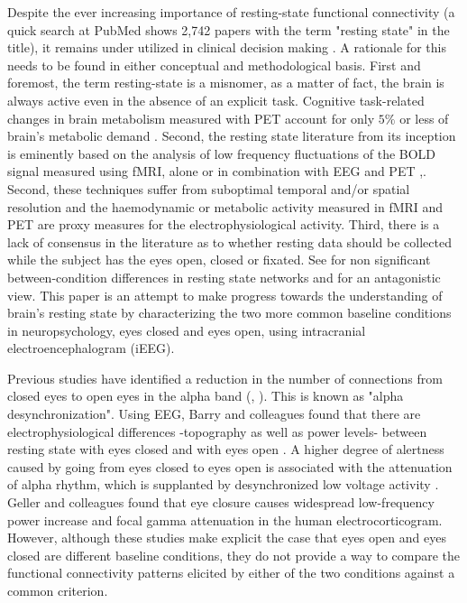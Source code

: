 \documentclass[11pt, onecolumn]{article}
\begin{document}
Despite the ever increasing importance of resting-state functional connectivity (a quick search at PubMed shows 2,742 papers with the term "resting state" in the title), it remains under utilized in clinical decision making \citep{tracy2015resting}.
A rationale for this needs to be found in either conceptual and methodological basis. First and foremost, the term resting-state is a misnomer, as a matter of fact, the brain is always active even in the absence of an explicit task. Cognitive task-related changes in brain metabolism measured with PET account for only $5\%$ or less of brain's metabolic demand \citep{sokoloff1955effect}. 
Second, the resting state literature from its inception is eminently based on the analysis of low frequency fluctuations of the BOLD signal measured using fMRI, alone or in combination with EEG and PET \citep{van2010exploring},\citep{musso2010spontaneous}. Second, these techniques suffer from suboptimal temporal and/or spatial resolution and the haemodynamic or metabolic activity measured in fMRI and PET are proxy measures for the electrophysiological activity. Third, there is a lack of consensus in the literature as to whether resting data should be collected while the subject has the eyes open, closed or fixated. See \citep{patriat2013effect} for non significant between-condition differences in resting state networks and \citep{yan2009spontaneous} for an antagonistic view. 
This paper is an attempt to make progress towards the understanding of brain's resting state by characterizing the two more common baseline conditions in neuropsychology, eyes closed and eyes open, using intracranial electroencephalogram (iEEG).

Previous studies have identified a reduction in the number of connections from closed eyes to open eyes in the alpha band (\citep{tan2013difference}, \citep{barry2007eeg}). This is known as  "alpha desynchronization". Using EEG, Barry and colleagues found that there are electrophysiological differences -topography as well as power levels- between resting state with eyes closed and with eyes open \citep{barry2007eeg}.  
A higher degree of alertness caused by going from eyes closed to eyes open is associated with the attenuation of alpha rhythm, which is supplanted by desynchronized low voltage activity \citep{niedermeyer2005electroencephalography}.
Geller and colleagues \citep{geller2014eye} found that eye closure causes widespread low-frequency power increase and focal gamma attenuation in the human electrocorticogram. 
However, although these studies make explicit the case that eyes open and eyes closed are different baseline conditions, they do not provide a way to compare the functional connectivity patterns elicited by either of the two conditions against a common criterion.
\end{document}
